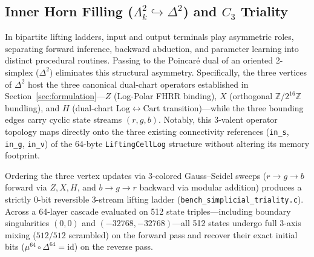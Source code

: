 \documentclass[11pt, a4paper]{article}
\begin{document}
\subsection{Inner Horn Filling ($\Lambda^2_k \hookrightarrow \Delta^2$) and $C_3$ Triality}
In bipartite lifting ladders, input and output terminals play asymmetric roles, separating forward inference, backward abduction, and parameter learning into distinct procedural routines. Passing to the Poincar\'{e} dual of an oriented 2-simplex ($\Delta^2$) eliminates this structural asymmetry. Specifically, the three vertices of $\Delta^2$ host the three canonical dual-chart operators established in Section~\ref{sec:formulation}---$Z$ (Log-Polar FHRR binding), $X$ (orthogonal $\mathbb{Z}/2^{16}\mathbb{Z}$ bundling), and $H$ (dual-chart $\mathrm{Log} \leftrightarrow \mathrm{Cart}$ transition)---while the three bounding edges carry cyclic state streams $(r, g, b)$. Notably, this 3-valent operator topology maps directly onto the three existing connectivity references (\texttt{in\_s}, \texttt{in\_g}, \texttt{in\_v}) of the 64-byte \texttt{LiftingCellLog} structure without altering its memory footprint.

Ordering the three vertex updates via 3-colored Gauss--Seidel sweeps ($r \to g \to b$ forward via $Z, X, H$, and $b \to g \to r$ backward via modular addition) produces a strictly 0-bit reversible 3-stream lifting ladder (\texttt{bench\_simplicial\_triality.c}). Across a 64-layer cascade evaluated on 512 state triples---including boundary singularities $(0,0)$ and $(-32768,-32768)$---all 512 states undergo full 3-axis mixing ($512/512$ scrambled) on the forward pass and recover their exact initial bits ($\mu^{64} \circ \Delta^{64} = \mathrm{id}$) on the reverse pass.
\end{document}
